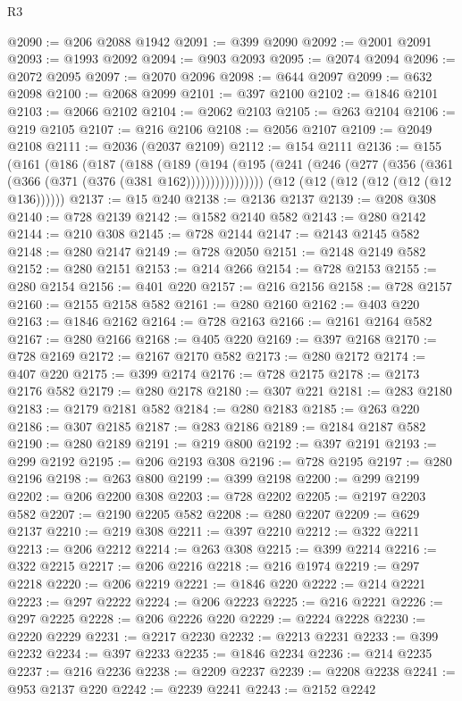 \begin{lexlean}{R3}
\begin{coremodule}
@2090 := @206 @2088 @1942
@2091 := @399 @2090
@2092 := @2001 @2091
@2093 := @1993 @2092
@2094 := @903 @2093
@2095 := @2074 @2094
@2096 := @2072 @2095
@2097 := @2070 @2096
@2098 := @644 @2097
@2099 := @632 @2098
@2100 := @2068 @2099
@2101 := @397 @2100
@2102 := @1846 @2101
@2103 := @2066 @2102
@2104 := @2062 @2103
@2105 := @263 @2104
@2106 := @219 @2105
@2107 := @216 @2106
@2108 := @2056 @2107
@2109 := @2049 @2108
@2111 := @2036 (@2037 @2109)
@2112 := @154 @2111
@2136 := @155
    (@161
      (@186
        (@187
          (@188
            (@189
              (@194 (@195 (@241 (@246 (@277 (@356 (@361 (@366 (@371 (@376 (@381 @162))))))))))))))))
    (@12 (@12 (@12 (@12 (@12 (@12 @136))))))
@2137 := @15 @240
@2138 := @2136 @2137
@2139 := @208 @308
@2140 := @728 @2139
@2142 := @1582 @2140 @582
@2143 := @280 @2142
@2144 := @210 @308
@2145 := @728 @2144
@2147 := @2143 @2145 @582
@2148 := @280 @2147
@2149 := @728 @2050
@2151 := @2148 @2149 @582
@2152 := @280 @2151
@2153 := @214 @266
@2154 := @728 @2153
@2155 := @280 @2154
@2156 := @401 @220
@2157 := @216 @2156
@2158 := @728 @2157
@2160 := @2155 @2158 @582
@2161 := @280 @2160
@2162 := @403 @220
@2163 := @1846 @2162
@2164 := @728 @2163
@2166 := @2161 @2164 @582
@2167 := @280 @2166
@2168 := @405 @220
@2169 := @397 @2168
@2170 := @728 @2169
@2172 := @2167 @2170 @582
@2173 := @280 @2172
@2174 := @407 @220
@2175 := @399 @2174
@2176 := @728 @2175
@2178 := @2173 @2176 @582
@2179 := @280 @2178
@2180 := @307 @221
@2181 := @283 @2180
@2183 := @2179 @2181 @582
@2184 := @280 @2183
@2185 := @263 @220
@2186 := @307 @2185
@2187 := @283 @2186
@2189 := @2184 @2187 @582
@2190 := @280 @2189
@2191 := @219 @800
@2192 := @397 @2191
@2193 := @299 @2192
@2195 := @206 @2193 @308
@2196 := @728 @2195
@2197 := @280 @2196
@2198 := @263 @800
@2199 := @399 @2198
@2200 := @299 @2199
@2202 := @206 @2200 @308
@2203 := @728 @2202
@2205 := @2197 @2203 @582
@2207 := @2190 @2205 @582
@2208 := @280 @2207
@2209 := @629 @2137
@2210 := @219 @308
@2211 := @397 @2210
@2212 := @322 @2211
@2213 := @206 @2212
@2214 := @263 @308
@2215 := @399 @2214
@2216 := @322 @2215
@2217 := @206 @2216
@2218 := @216 @1974
@2219 := @297 @2218
@2220 := @206 @2219
@2221 := @1846 @220
@2222 := @214 @2221
@2223 := @297 @2222
@2224 := @206 @2223
@2225 := @216 @2221
@2226 := @297 @2225
@2228 := @206 @2226 @220
@2229 := @2224 @2228
@2230 := @2220 @2229
@2231 := @2217 @2230
@2232 := @2213 @2231
@2233 := @399 @2232
@2234 := @397 @2233
@2235 := @1846 @2234
@2236 := @214 @2235
@2237 := @216 @2236
@2238 := @2209 @2237
@2239 := @2208 @2238
@2241 := @953 @2137 @220
@2242 := @2239 @2241
@2243 := @2152 @2242

\end{coremodule}
\end{lexlean}
